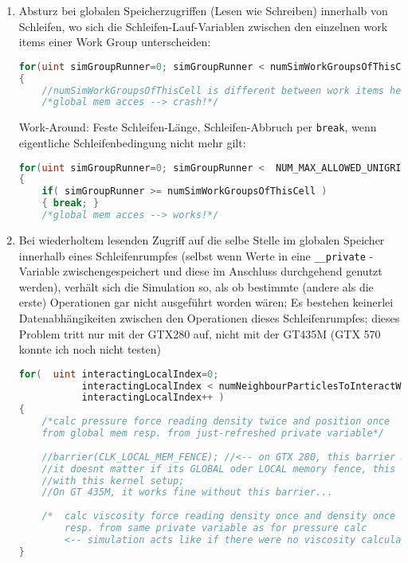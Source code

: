 		\begin{enumerate}
		
			\item Absturz bei globalen Speicherzugriffen (Lesen wie Schreiben) innerhalb von Schleifen, 
			wo sich die Schleifen-Lauf-Variablen zwischen den einzelnen work items einer
			Work Group unterscheiden:
			\begin{lstlisting}[language=OpenCL]
for(uint simGroupRunner=0; simGroupRunner < numSimWorkGroupsOfThisCell; simGroupRunner++ )
{
	//numSimWorkGroupsOfThisCell is different between work items here!
	/*global mem acces --> crash!*/
			\end{lstlisting}
			
			Work-Around: Feste Schleifen-Länge, Schleifen-Abbruch per \lstinline|break|, wenn eigentliche
			Schleifenbedingung nicht mehr gilt:
			\begin{lstlisting}[language=OpenCL]
for(uint simGroupRunner=0; simGroupRunner <  NUM_MAX_ALLOWED_UNIGRID_CELL_SPLIT_FACTOR; simGroupRunner++ )
{
	if( simGroupRunner >= numSimWorkGroupsOfThisCell )
    { break; }
    /*global mem acces --> works!*/
			\end{lstlisting}
			
		\item Bei wiederholtem lesenden Zugriff auf die selbe Stelle im 
		globalen Speicher innerhalb eines Schleifenrumpfes (selbst wenn Werte in eine 
		\lstinline|__private| -Variable zwischengespeichert und diese im Anschluss durchgehend genutzt werden),
		verhält sich die Simulation so, als ob bestimmte (andere als die erste)
		Operationen gar nicht ausgeführt worden wären; Es bestehen keinerlei Datenabhängikeiten zwischen
		den Operationen dieses Schleifenrumpfes;
		dieses Problem tritt nur mit der GTX280 auf, nicht mit der GT435M (GTX 570 konnte ich noch nicht testen)
		\begin{lstlisting}[language=OpenCL]
for(  uint interactingLocalIndex=0; 
           interactingLocalIndex < numNeighbourParticlesToInteractWith;
           interactingLocalIndex++ )
{  
	/*calc pressure force reading density twice and position once 
	from global mem resp. from just-refreshed private variable*/ 
	
	//barrier(CLK_LOCAL_MEM_FENCE); //<-- on GTX 280, this barrier must be commented in; 
	//it doesnt matter if its GLOBAL oder LOCAL memory fence, this is weird, as there is no local memory accces at all
	//with this kernel setup; 
	//On GT 435M, it works fine without this barrier...
	
	/*	calc viscosity force reading density once and density once from global mem 
		resp. from same private variable as for pressure calc
		<-- simulation acts like if there were no viscosity calculation at all without barrier!*/
}
		\end{lstlisting}
		

\end{enumerate}
